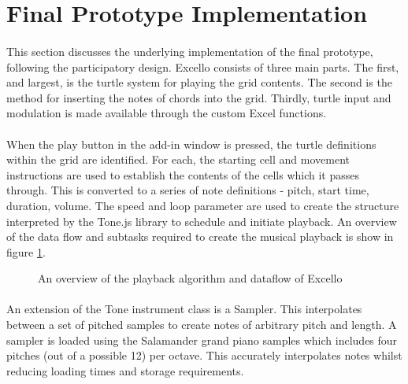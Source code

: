 \section{Final Prototype Implementation}

\paragraph{} This section discusses the underlying implementation of the final prototype, following the participatory design. Excello consists of three main parts. The first, and largest, is the turtle system for playing the grid contents. The second is the method for inserting the notes of chords into the grid. Thirdly, turtle input and modulation is made available through the custom Excel functions.

\paragraph{} When the play button in the add-in window is pressed, the turtle definitions within the grid are identified. For each, the starting cell and movement instructions are used to establish the contents of the cells which it passes through. This is converted to a series of note definitions - pitch, start time, duration, volume. The speed and loop parameter are used to create the structure interpreted by the Tone.js library to schedule and initiate playback. An overview of the data flow and subtasks required to create the musical playback is show in figure \ref{fig:overview}.

\begin{figure}[tbh]
\begin{center}

\end{center}
\caption{An overview of the playback algorithm and dataflow of Excello}
\label{fig:overview}
\end{figure}

\paragraph{} An extension of the Tone instrument class is a Sampler. This interpolates between a set of pitched samples to create notes of arbitrary pitch and length. A sampler is loaded using the Salamander grand piano samples which includes four pitches (out of a possible 12) per octave. This accurately interpolates notes whilst reducing loading times and storage requirements.

